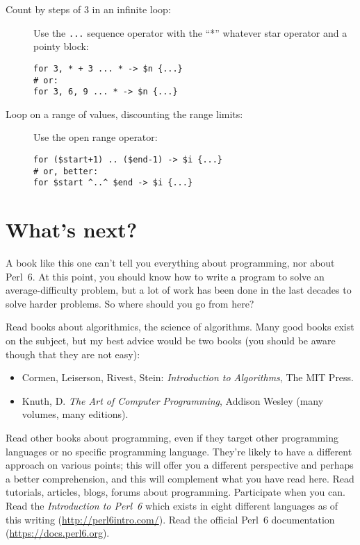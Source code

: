 \begin{description}
\item[Count by steps of 3 in an infinite loop:] Use the \verb'...' 
sequence operator with the ``*'' whatever star operator and 
a pointy block:

\begin{verbatim}
for 3, * + 3 ... * -> $n {...}
# or:
for 3, 6, 9 ... * -> $n {...}    
\end{verbatim}

\item[Loop on a range of values, discounting the range limits:] Use 
the open range operator:

\begin{verbatim}
for ($start+1) .. ($end-1) -> $i {...}
# or, better:
for $start ^..^ $end -> $i {...}
\end{verbatim}
\end{description}

\section{What's next?}

A book like this one can't tell you everything about programming,  
nor about Perl~6. At this point, you should know how to write a 
program to solve an average-difficulty problem, but a lot of work 
has been done in the last decades to solve harder problems. So 
where should you go from here?

Read books about algorithmics, the science of algorithms. Many good 
books exist on the subject, but my best advice would be two books (you should be aware though that they are not easy):
\begin{itemize}
\item Cormen, Leiserson, Rivest, Stein: \emph{Introduction to 
Algorithms}, The MIT Press.
\item Knuth, D. \emph{The Art of Computer Programming}, Addison Wesley 
(many volumes, many editions).
\end{itemize}

Read other books about programming, even if they 
target other programming languages or no specific programming 
language. They're likely to have a 
different approach on various points; this will offer you a 
different perspective and perhaps a better comprehension, and 
this will complement what you have read here. 
Read tutorials, articles, blogs, forums about programming. 
Participate when you can. Read the \emph{Introduction to 
Perl~6} which exists in eight different languages as of 
this writing (\url{http://perl6intro.com/}). Read the 
official Perl~6 documentation (\url{https://docs.perl6.org}).

